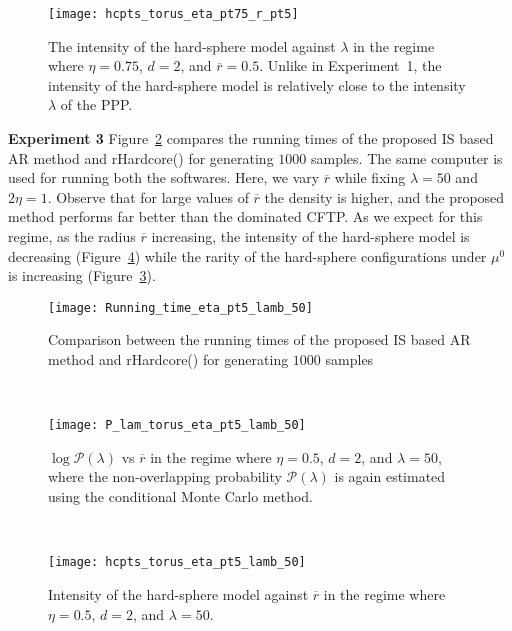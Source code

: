 \documentclass[11pt]{article}
\newcommand{\rbdd}{\overline{r}}
\newcommand{\pno}{\mathcal{P}(\lambda)}
\begin{document}
\begin{figure}[h]
 \centering
\texttt{[image: hcpts\_torus\_eta\_pt75\_r\_pt5]}
\caption{The intensity of the hard-sphere model against $\lambda$ in the regime where $\eta = 0.75$, $d = 2$, and $\rbdd = 0.5$. Unlike in Experiment~1, the intensity of the hard-sphere model is relatively close to the intensity $\lambda$ of the PPP.}
\label{pic:exp2-hcpts}
\end{figure}

\noindent
{\bf Experiment 3} Figure~\ref{pic:Compare3} compares the running times  of the proposed IS based AR method and {\sf rHardcore()} for generating $1000$ samples. The same computer is used for running both the softwares. Here, we vary $\rbdd$ while fixing $\lambda = 50$ and $2\eta = 1$. Observe that for large values of $\rbdd$  the density is higher, and the proposed method performs far better than the dominated CFTP.  As we expect for this regime, as the radius $\overline r$ increasing, the intensity of the hard-sphere model is decreasing (Figure~\ref{pic:exp3-hcpts}) while the rarity of the hard-sphere configurations under $\mu^0$ is increasing (Figure~\ref{pic:exp3-plam}). 

\begin{figure}[h]
 \centering
\texttt{[image: Running\_time\_eta\_pt5\_lamb\_50]}
\caption{Comparison  between the running times  of the proposed IS based AR method and {\sf rHardcore()} for generating $1000$ samples}
\label{pic:Compare3}
\end{figure}
~
\begin{figure}[H]
 \centering
\texttt{[image: P\_lam\_torus\_eta\_pt5\_lamb\_50]}
\caption{$\log \pno$ vs $\rbdd$ in the regime where $\eta = 0.5$, $d = 2$, and $\lambda = 50$, where the non-overlapping probability $\pno$ is again estimated using the conditional Monte Carlo method.}
\label{pic:exp3-plam}
\end{figure}
~
\begin{figure}[H]
 \centering
\texttt{[image: hcpts\_torus\_eta\_pt5\_lamb\_50]}
\caption{Intensity of the hard-sphere model against $\overline{r}$ in the regime where $\eta = 0.5$, $d = 2$, and $\lambda = 50$. }
\label{pic:exp3-hcpts}
\end{figure}
\end{document}
